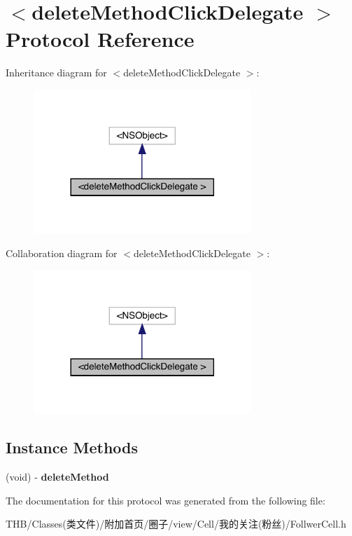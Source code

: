 \hypertarget{protocoldelete_method_click_delegate_01-p}{}\section{$<$delete\+Method\+Click\+Delegate $>$ Protocol Reference}
\label{protocoldelete_method_click_delegate_01-p}


Inheritance diagram for $<$delete\+Method\+Click\+Delegate $>$\+:\nopagebreak
\begin{figure}[H]
\begin{center}
\leavevmode
\includegraphics[width=233pt]{protocoldelete_method_click_delegate_01-p__inherit__graph}
\end{center}
\end{figure}


Collaboration diagram for $<$delete\+Method\+Click\+Delegate $>$\+:\nopagebreak
\begin{figure}[H]
\begin{center}
\leavevmode
\includegraphics[width=233pt]{protocoldelete_method_click_delegate_01-p__coll__graph}
\end{center}
\end{figure}
\subsection*{Instance Methods}
\begin{DoxyCompactItemize}
\item 
\mbox{\label{protocoldelete_method_click_delegate_01-p_a1eddc6fa271959d7310f2b09ec254221}} 
(void) -\/ {\bfseries delete\+Method}
\end{DoxyCompactItemize}


The documentation for this protocol was generated from the following file\+:\begin{DoxyCompactItemize}
\item 
T\+H\+B/\+Classes(类文件)/附加首页/圈子/view/\+Cell/我的关注(粉丝)/Follwer\+Cell.\+h\end{DoxyCompactItemize}
